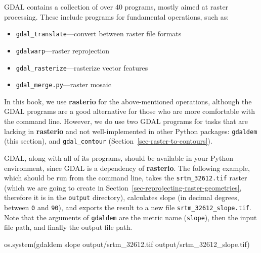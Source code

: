 \documentclass[
  letterpaper,
]{krantz}
\newenvironment{Shaded}{\begin{snugshade}}{\end{snugshade}}
\newcommand{\NormalTok}[1]{\textcolor[rgb]{0.00,0.23,0.31}{#1}}
\newcommand{\StringTok}[1]{\textcolor[rgb]{0.13,0.47,0.30}{#1}}
\providecommand{\tightlist}{%
  \setlength{\itemsep}{0pt}\setlength{\parskip}{0pt}}\usepackage{longtable,booktabs,array}
\begin{document}
\begin{tcolorbox}[enhanced jigsaw, colframe=quarto-callout-note-color-frame, arc=.35mm, leftrule=.75mm, bottomrule=.15mm, coltitle=black, colbacktitle=quarto-callout-note-color!10!white, title=\textcolor{quarto-callout-note-color}{\faInfo}\hspace{0.5em}{Note}, opacityback=0, toptitle=1mm, bottomtitle=1mm, colback=white, opacitybacktitle=0.6, titlerule=0mm, rightrule=.15mm, toprule=.15mm, breakable, left=2mm]

GDAL contains a collection of over 40 programs, mostly aimed at raster
processing. These include programs for fundamental operations, such as:

\begin{itemize}
\tightlist
\item
  \texttt{gdal\_translate}---convert between raster file formats
\item
  \texttt{gdalwarp}---raster reprojection
\item
  \texttt{gdal\_rasterize}---rasterize vector features
\item
  \texttt{gdal\_merge.py}---raster mosaic
\end{itemize}

In this book, we use \textbf{rasterio} for the above-mentioned
operations, although the GDAL programs are a good alternative for those
who are more comfortable with the command line. However, we do use two
GDAL programs for tasks that are lacking in \textbf{rasterio} and not
well-implemented in other Python packages: \texttt{gdaldem} (this
section), and \texttt{gdal\_contour}
(Section~\ref{sec-raster-to-contours}).

\end{tcolorbox}

GDAL, along with all of its programs, should be available in your Python
environment, since GDAL is a dependency of \textbf{rasterio}. The
following example, which should be run from the command line, takes the
\texttt{srtm\_32612.tif} raster (which we are going to create in
Section~\ref{sec-reprojecting-raster-geometries}, therefore it is in the
\texttt{\textquotesingle{}output\textquotesingle{}} directory),
calculates slope (in decimal degrees, between \texttt{0} and
\texttt{90}), and exports the result to a new file
\texttt{srtm\_32612\_slope.tif}. Note that the arguments of
\texttt{gdaldem} are the metric name (\texttt{slope}), then the input
file path, and finally the output file path.

\begin{Shaded}
\begin{Highlighting}[]
\NormalTok{os.system(}\StringTok{\textquotesingle{}gdaldem slope output/srtm\_32612.tif output/srtm\_32612\_slope.tif\textquotesingle{}}\NormalTok{)}
\end{Highlighting}
\end{Shaded}
\end{document}
